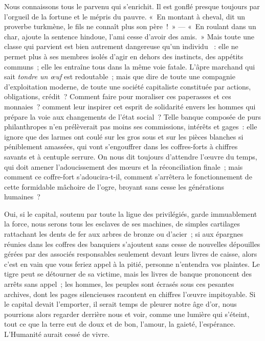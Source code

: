 \documentclass[french,twoside]{book} %
\begin{document}
Nous connaissons tous le parvenu qui s’enrichit. Il est gonflé presque toujours par l’orgueil de la fortune et le mépris du pauvre. « En montant à cheval, dit un proverbe turkmène, le fils ne connaît plus son père ! » — « En roulant dans un char, ajoute la sentence hindoue, l’ami cesse d’avoir des amis. » Mais toute une classe qui parvient est bien autrement dangereuse qu’un individu  : elle ne permet plus à ses membres isolés d’agir en dehors des instincts, des appétits communs ; elle les entraîne tous dans la même voie fatale. L’âpre marchand qui sait \emph{tondre un œuf} est redoutable ; mais que dire de toute une compagnie d’exploitation moderne, de toute une société capitaliste constituée par actions, obligations, crédit ? Comment faire pour moraliser ces paperasses et ces monnaies ? comment leur inspirer cet esprit de solidarité envers les hommes qui prépare la voie aux changements de l’état social ? Telle banque composée de purs philanthropes n’en prélèverait pas moins ses commissions, intérêts et gages : elle ignore que des larmes ont coulé sur les gros sous et sur les pièces blanches si péniblement amassées, qui  vont s’engouffrer dans les coffres-forts à chiffres savants et à centuple serrure. On nous dit toujours d’attendre l’œuvre du temps, qui doit amener l’adoucissement des mœurs et la réconciliation finale ; mais comment ce coffre-fort s’adoucira-t-il, comment s’arrêtera le fonctionnement de cette formidable mâchoire de l’ogre, broyant sans cesse les générations humaines ?\par
Oui, si le capital, soutenu par toute la ligue des privilégiés, garde immuablement la force, nous serons tous les esclaves de ses machines, de simples cartilages rattachant les dents de fer aux arbres de bronze ou d’acier ; si aux épargnes réunies dans les coffres des banquiers s’ajoutent sans cesse de nouvelles dépouilles gérées par des associés  responsables seulement devant leurs livres de caisse, alors c’est en vain que vous feriez appel à la pitié, personne n’entendra vos plaintes. Le tigre peut se détourner de sa victime, mais les livres de banque prononcent des arrêts sans appel ; les hommes, les peuples sont écrasés sous ces pesantes archives, dont les pages silencieuses racontent en chiffres l’œuvre impitoyable. Si le capital devait l’emporter, il serait temps de pleurer notre âge d’or, nous pourrions alors regarder derrière nous et voir, comme une lumière qui s’éteint, tout ce que la terre eut de doux et de bon, l’amour, la gaieté, l’espérance. L’Humanité aurait cessé de vivre.\par
\end{document}
